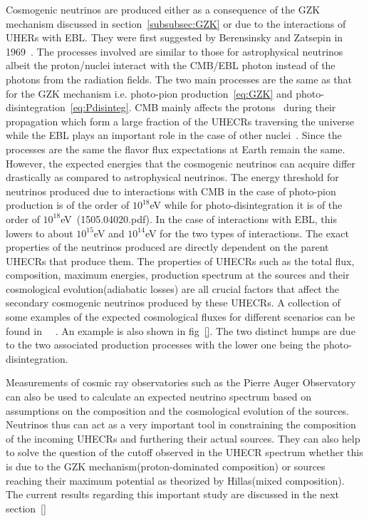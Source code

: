 Cosmogenic neutrinos are produced either as a consequence of the GZK mechanism discussed in section~\ref{subsubsec:GZK} or due to the interactions of UHERs with EBL. They were first suggested by Berensinsky and Zatsepin in 1969~\cite{}. The processes involved are similar to those for astrophysical neutrinos albeit the proton/nuclei interact with the CMB/EBL photon instead of the photons from the radiation fields. The two main processes are the same as that for the GZK mechanism i.e. photo-pion production~\ref{eq:GZK} and photo-disintegration~\ref{eq:Pdisinteg}. CMB mainly affects the protons~\cite{} during their propagation which form a large fraction of the UHECRs traversing the universe while the EBL plays an important role in the case of other nuclei~\cite{}. 
Since the processes are the same the flavor flux expectations at Earth remain the same. However, the expected energies that the cosmogenic neutrinos can acquire differ drastically as compared to astrophysical neutrinos. The energy threshold for neutrinos produced due to interactions with CMB in the case of photo-pion production is of the order of $10^{18}$eV while for photo-disintegration it is of the order of $10^{18}$eV~\cite{}(1505.04020.pdf). In the case of interactions with EBL, this lowers to about $10^{15}$eV and $10^{14}$eV for the two types of interactions. 
The exact properties of the neutrinos produced are directly dependent on the parent UHECRs that produce them. The properties of UHECRs such as the total flux, composition, maximum energies, production spectrum at the sources and their cosmological evolution(adiabatic losses) are all crucial factors that affect the secondary cosmogenic neutrinos produced by these UHECRs. A collection of some examples of the expected cosmological fluxes for different scenarios can be found in ~\cite{}~\cite{}. An example is also shown in fig~\ref{}. The two distinct humps are due to the two associated production processes with the lower one being the photo-disintegration. 

Measurements of cosmic ray observatories such as the Pierre Auger Observatory can also be used to calculate an expected neutrino spectrum based on assumptions on the composition and the cosmological evolution of the sources. Neutrinos thus can act as a very important tool in constraining the composition of the incoming UHECRs and furthering their actual sources. They can also help to solve the question of the cutoff observed in the UHECR spectrum whether this is due to the GZK mechanism(proton-dominated composition) or sources reaching their maximum potential as theorized by Hillas(mixed composition). The current results regarding this important study are discussed in the next section~\ref{}


